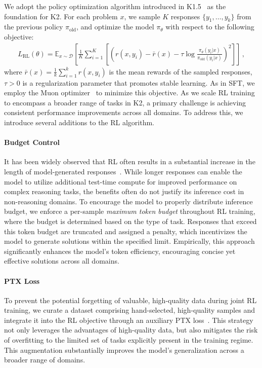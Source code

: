 We adopt the policy optimization algorithm introduced in K1.5~\citep{team2025kimi} as the foundation for K2. 
For each problem $x$, we sample $K$ responses $\{y_1,\dots,y_k\}$ from the previous policy $\pi_{\mathrm{old}}$, 
and optimize the model $\pi_\theta$ with respect to the following objective: 
\begin{align*}
L_{\mathrm{RL}}(\theta) = \mathbb{E}_{x \sim\mathcal{D}}\left[ \frac{1}{K} \sum_{i=1}^K \left[  \left( r(x, y_i) - \bar{r}(x)- \tau \log \frac{\pi_\theta(y_i | x)}{{\pi}_{\mathrm{old}}(y_i | x)} \right)^2 \right]\right] \, ,
\label{eq:rl-objective}
\end{align*}
where $\bar{r}(x) = \frac{1}{k}\sum_{i=1}^k r(x, y_i)$ is the mean rewards of the sampled responses, $\tau>0$ is a regularization parameter that promotes stable learning. 
As in SFT, we employ the Muon optimizer~\citep{jordan2024muon} to minimize this objective. 
As we scale RL training to encompass a broader range of tasks in K2, a primary challenge is achieving consistent performance improvements across all domains. To address this, we introduce several additions to the RL algorithm. 


\paragraph{Budget Control}
It has been widely observed that RL often results in a substantial increase in the length of model-generated responses~\citep{team2025kimi,guo2025deepseek}. While longer responses can enable the model to utilize additional test-time compute for improved performance on complex reasoning tasks, the benefits often do not justify its inference cost in non-reasoning domains. 
To encourage the model to properly distribute inference budget, we enforce a per-sample \emph{maximum token budget} throughout RL training, where the budget is determined based on the type of task.  
 Responses that exceed this token budget are truncated and assigned a penalty, which incentivizes the model to generate solutions within the specified limit. Empirically, this approach significantly enhances the model's token efficiency, encouraging concise yet effective solutions across all domains.


\paragraph{PTX Loss} 

To prevent the potential forgetting of valuable, high-quality data during joint RL training, we curate a dataset comprising hand-selected, high-quality samples and integrate it into the RL objective through an auxiliary PTX loss~\citep{ouyang2022training}.
This strategy not only leverages the advantages of high-quality data, but also mitigates the risk of overfitting to the limited set of tasks explicitly present in the training regime. 
This augmentation substantially improves the model's generalization across a broader range of domains.

